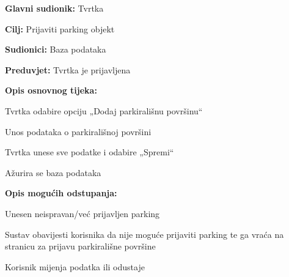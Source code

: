 					\begin{packed_item}
						
						\item  \textbf{Glavni sudionik: } Tvrtka
						\item  \textbf{Cilj:} Prijaviti parking objekt
						\item  \textbf{Sudionici:} Baza podataka
						\item  \textbf{Preduvjet:} Tvrtka je prijavljena
						\item  \textbf{Opis osnovnog tijeka:}
						
						\item[] \begin{packed_enum}
							\item Tvrtka odabire opciju „Dodaj parkirališnu površinu“
							\item Unos podataka o parkirališnoj površini
							\item Tvrtka unese sve podatke i odabire „Spremi“
							\item Ažurira se baza podataka
						\end{packed_enum}
						
						\item  \textbf{Opis mogućih odstupanja:}
						
						\item[] \begin{packed_item}
							
							\item[2.a]  Unesen neispravan/već prijavljen parking
							\item[] \begin{packed_enum}
								
								\item Sustav obavijesti korisnika da nije moguće prijaviti parking te ga vraća na stranicu za prijavu parkirališne površine
								\item Korisnik mijenja podatka ili odustaje
								
							\end{packed_enum}
						\end{packed_item}
					\end{packed_item}
					\noindent {}
